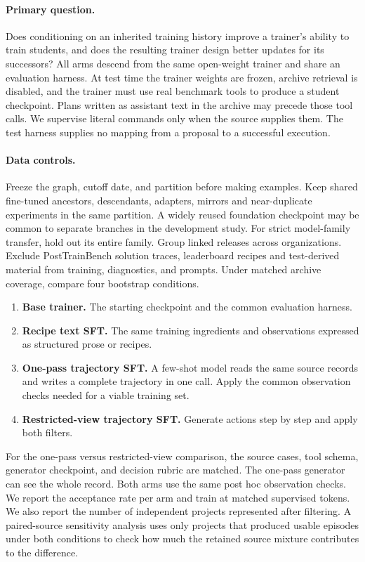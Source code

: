 \documentclass{article}
\begin{document}
\paragraph{Primary question.}
Does conditioning on an inherited training history improve a trainer's ability to train students, and does the resulting trainer design better updates for its successors? All arms descend from the same open-weight trainer and share an evaluation harness. At test time the trainer weights are frozen, archive retrieval is disabled, and the trainer must use real benchmark tools to produce a student checkpoint. Plans written as assistant text in the archive may precede those tool calls. We supervise literal commands only when the source supplies them. The test harness supplies no mapping from a proposal to a successful execution.

\paragraph{Data controls.}
Freeze the graph, cutoff date, and partition before making examples. Keep shared fine-tuned ancestors, descendants, adapters, mirrors and near-duplicate experiments in the same partition. A widely reused foundation checkpoint may be common to separate branches in the development study. For strict model-family transfer, hold out its entire family. Group linked releases across organizations. Exclude PostTrainBench solution traces, leaderboard recipes and test-derived material from training, diagnostics, and prompts. Under matched archive coverage, compare four bootstrap conditions.

\begin{enumerate}
  \item \textbf{Base trainer.} The starting checkpoint and the common evaluation harness.
  \item \textbf{Recipe text SFT.} The same training ingredients and observations expressed as structured prose or recipes.
  \item \textbf{One-pass trajectory SFT.} A few-shot model reads the same source records and writes a complete trajectory in one call. Apply the common observation checks needed for a viable training set.
  \item \textbf{Restricted-view trajectory SFT.} Generate actions step by step and apply both filters.
\end{enumerate}

For the one-pass versus restricted-view comparison, the source cases, tool schema, generator checkpoint, and decision rubric are matched. The one-pass generator can see the whole record. Both arms use the same post hoc observation checks. We report the acceptance rate per arm and train at matched supervised tokens. We also report the number of independent projects represented after filtering. A paired-source sensitivity analysis uses only projects that produced usable episodes under both conditions to check how much the retained source mixture contributes to the difference.
\end{document}
